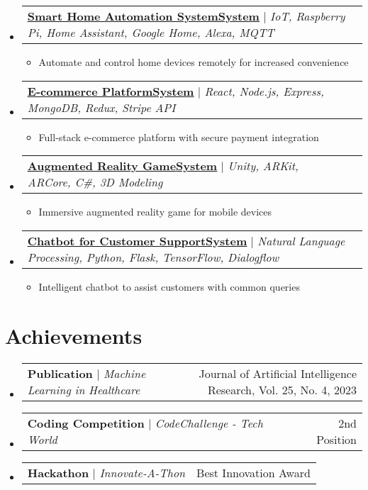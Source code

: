 \documentclass[letterpaper,11pt]{article}%
\makeatletter
\newcommand{\resumeItem}[1]{
  \item\small{
    {#1 \vspace{-2pt}}
  }
}
\newcommand{\resumeProjectHeading}[2]{
    \item
    \begin{tabular*}{0.97\textwidth}{l@{\extracolsep{\fill}}r}
      \small#1 & #2 \\
    \end{tabular*}\vspace{-7pt}
}
\newcommand{\resumeSubHeadingListStart}{\begin{itemize}[leftmargin=0.15in, label={}]}
\newcommand{\resumeSubHeadingListEnd}{\end{itemize}}
\newcommand{\resumeItemListStart}{\begin{itemize}}
\newcommand{\resumeItemListEnd}{\end{itemize}\vspace{-5pt}}
\makeatother
\begin{document}
%
\resumeSubHeadingListStart%
\resumeProjectHeading%
{\textbf{\href{https://github.com/JohnDoe/Smart-Home-Automation}{\underline{Smart Home Automation SystemSystem}}} $|$ \footnotesize\emph{IoT, Raspberry Pi, Home Assistant, Google Home, Alexa, MQTT}}{}%
\resumeItemListStart%
\resumeItem{Automate and control home devices remotely for increased convenience}%
\resumeItemListEnd%
\resumeProjectHeading%
{\textbf{\href{https://github.com/JohnDoe/E-commerce-Platform}{\underline{E-commerce PlatformSystem}}} $|$ \footnotesize\emph{React, Node.js, Express, MongoDB, Redux, Stripe API}}{}%
\resumeItemListStart%
\resumeItem{Full{-}stack e{-}commerce platform with secure payment integration}%
\resumeItemListEnd%
\resumeProjectHeading%
{\textbf{\href{https://github.com/JohnDoe/AR-Game}{\underline{Augmented Reality GameSystem}}} $|$ \footnotesize\emph{Unity, ARKit, ARCore, C#, 3D Modeling}}{}%
\resumeItemListStart%
\resumeItem{Immersive augmented reality game for mobile devices}%
\resumeItemListEnd%
\resumeProjectHeading%
{\textbf{\href{https://github.com/JohnDoe/Customer-Support-Chatbot}{\underline{Chatbot for Customer SupportSystem}}} $|$ \footnotesize\emph{Natural Language Processing, Python, Flask, TensorFlow, Dialogflow}}{}%
\resumeItemListStart%
\resumeItem{Intelligent chatbot to assist customers with common queries}%
\resumeItemListEnd%
\resumeSubHeadingListEnd%
\section{Achievements}%
\label{sec:Achievements}%

%
\resumeSubHeadingListStart%
\resumeProjectHeading%
{\textbf{Publication} $|$ \footnotesize\emph{Machine Learning in Healthcare}}{Journal of Artificial Intelligence Research, Vol. 25, No. 4, 2023}%
\resumeProjectHeading%
{\textbf{Coding Competition} $|$ \footnotesize\emph{CodeChallenge - Tech World}}{2nd Position}%
\resumeProjectHeading%
{\textbf{Hackathon} $|$ \footnotesize\emph{Innovate-A-Thon}}{Best Innovation Award}%
\resumeSubHeadingListEnd%
\end{document}
